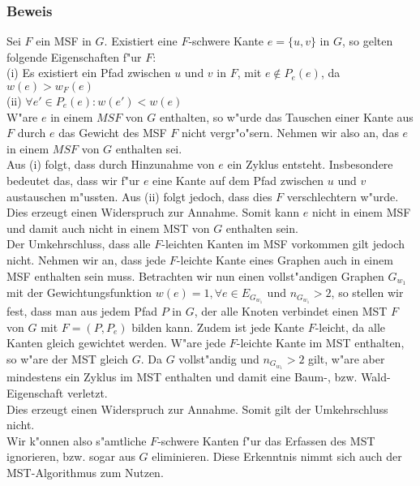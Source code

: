\subsubsection{Beweis}
\label{sec:fProof}

Sei $F$ ein MSF in $G$.
    Existiert eine $F$-schwere Kante $e=\{u, v\}$ in $G$, so gelten folgende 
    Eigenschaften f"ur $F$:\\
(i) Es existiert ein Pfad zwischen $u$ und $v$ in $F$, mit $e \not \in P_e(e)$,
    da $w(e) > w_F(e)$\\
(ii) $\forall e' \in P_e(e) : w(e') < w(e)$\\
W"are $e$ in einem $MSF$ von $G$ enthalten, so w"urde das Tauschen einer Kante aus
    $F$ durch $e$ das Gewicht des MSF $F$ nicht vergr"o"sern.
    Nehmen wir also an, das $e$ in einem $MSF$ von $G$ enthalten sei.\\
Aus (i) folgt, dass durch Hinzunahme von $e$ ein Zyklus entsteht. 
    Insbesondere bedeutet das, 
    dass wir f"ur $e$ eine Kante auf dem Pfad zwischen $u$ und $v$ austauschen
    m"ussten.
    Aus (ii) folgt jedoch, dass dies $F$ verschlechtern w"urde.
    Dies erzeugt einen Widerspruch zur Annahme.
    Somit kann $e$ nicht in einem MSF und damit auch nicht in einem MST
    von $G$ enthalten sein.\\
Der Umkehrschluss, dass alle $F$-leichten Kanten im MSF vorkommen gilt jedoch
    nicht.
    Nehmen wir an, dass jede $F$-leichte Kante eines Graphen auch in einem
    MSF enthalten sein muss.
    Betrachten wir nun einen vollst"andigen Graphen $G_{w_1}$ mit der 
    Gewichtungsfunktion $w(e) = 1, \forall e \in E_{G_{w_1}}$ und 
    $n_{G_{w_1}} > 2$, so stellen wir fest, dass man aus jedem Pfad $P$ in $G$, 
    der alle
    Knoten verbindet einen MST $F$ von $G$ mit $F=(P, P_e)$ 
    bilden kann.
    Zudem ist jede Kante $F$-leicht, da alle Kanten gleich gewichtet werden.
    W"are jede $F$-leichte Kante im MST enthalten, so w"are der MST gleich $G$.
    Da $G$ vollst"andig und $n_{G_{w_1}} > 2$ gilt, w"are aber mindestens ein Zyklus im 
    MST enthalten und damit eine Baum-, bzw. Wald-Eigenschaft verletzt.\\
    Dies erzeugt einen Widerspruch zur Annahme.
    Somit gilt der Umkehrschluss nicht.\\
Wir k"onnen also s"amtliche $F$-schwere Kanten f"ur das Erfassen des MST 
    ignorieren, bzw. sogar aus $G$ eliminieren.
    Diese Erkenntnis nimmt sich auch der MST-Algorithmus zum Nutzen.\\

